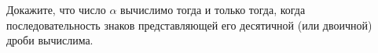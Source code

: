 Докажите, что число $\alpha$ вычислимо тогда и только тогда, когда последовательность знаков представляющей его десятичной
(или двоичной) дроби вычислима.